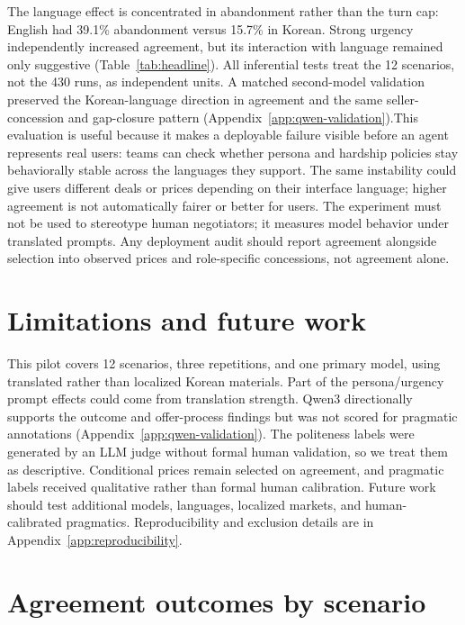 \documentclass{article}
\begin{document}
The language effect is concentrated in abandonment rather than the turn cap:
English had 39.1\% abandonment versus 15.7\% in Korean. Strong urgency independently increased agreement, but its interaction with
language remained only suggestive (Table~\ref{tab:headline}). All inferential tests treat the 12 scenarios, not the 430 runs, as
independent units. A matched second-model validation preserved the Korean-language direction in
agreement and the same seller-concession and gap-closure pattern
(Appendix~\ref{app:qwen-validation}).This evaluation is useful because it makes a deployable failure
visible before an agent represents real users: teams
can check whether persona and hardship policies stay behaviorally stable
across the languages they support. The same instability could give users different deals or prices depending
on their interface language; higher agreement is not automatically fairer or
better for users. The experiment must not be used to
stereotype human negotiators; it measures model behavior under translated
prompts. Any deployment audit should report agreement alongside selection into
observed prices and role-specific concessions, not agreement alone.

\section{Limitations and future work}
\label{sec:limitations}
This pilot covers 12 scenarios, three repetitions, and one primary model, using translated rather than localized Korean materials. Part of the persona/urgency prompt effects could come from translation strength. Qwen3 directionally supports the outcome and offer-process findings but was not scored for pragmatic annotations
(Appendix~\ref{app:qwen-validation}). The politeness labels were generated by an LLM judge without formal human validation, so we treat them as descriptive. Conditional prices remain selected on
agreement, and pragmatic labels received qualitative rather than formal human
calibration. Future work should test additional models, languages, localized
markets, and human-calibrated pragmatics. Reproducibility and exclusion details
are in Appendix~\ref{app:reproducibility}.
\clearpage


{\small

}


\clearpage
\appendix

\section{Agreement outcomes by scenario}
\label{app:scenario-agreement}
\end{document}
